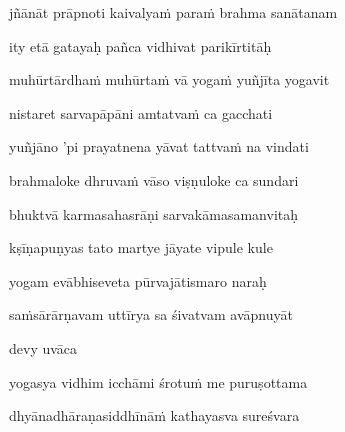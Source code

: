 jñānāt prāpnoti kaivalyaṁ paraṁ brahma sanātanam\thinspace{\dandab} \dontdisplaylinenum

ity etā gatayaḥ pañca vidhivat parikīrtitāḥ \veg\dontdisplaylinenum
{}

muhūrtārdhaṁ muhūrtaṁ vā yogaṁ yuñjīta yogavit\thinspace{\dandab} \dontdisplaylinenum

nistaret sarvapāpāni amtatvaṁ ca gacchati \veg\dontdisplaylinenum
{}

yuñjāno 'pi prayatnena yāvat tattvaṁ na vindati\thinspace{\dandab} \dontdisplaylinenum

brahmaloke dhruvaṁ vāso viṣṇuloke ca sundari \veg\dontdisplaylinenum
{}

bhuktvā karmasahasrāṇi sarvakāmasamanvitaḥ\thinspace{\dandab} \dontdisplaylinenum

kṣīṇapuṇyas tato martye jāyate vipule kule \veg\dontdisplaylinenum
{}

yogam evābhiseveta pūrvajātismaro naraḥ\thinspace{\dandab} \dontdisplaylinenum

saṁsārārṇavam uttīrya sa śivatvam avāpnuyāt \veg\dontdisplaylinenum


devy uvāca~{\dandab}\dontdisplaylinenum 

yogasya vidhim icchāmi śrotuṁ me puruṣottama\thinspace{\danda} \dontdisplaylinenum

dhyānadhāraṇasiddhīnāṁ kathayasva sureśvara \veg\dontdisplaylinenum
{}

